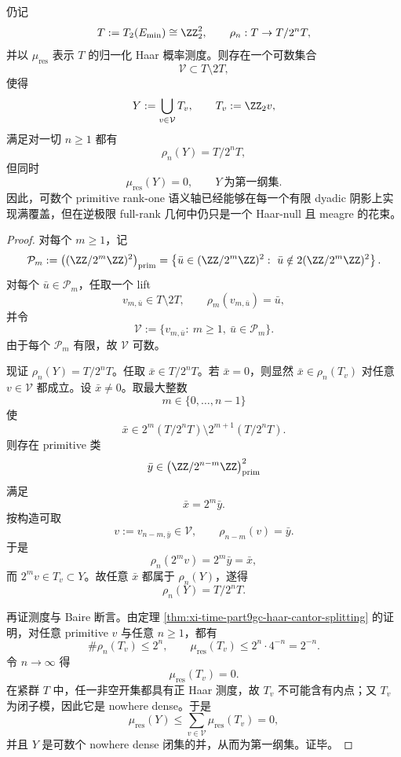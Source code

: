 \begin{theorem}\label{thm:conclusion-tate-rankone-finite-shadow-full-inverse-limit-hollow}
仍记
\[
T:=T_2(E_{\min})\cong \ZZ_2^2,
\qquad
\rho_n:T\to T/2^nT,
\]
并以 \(\mu_{\mathrm{res}}\) 表示 \(T\) 的归一化 Haar 概率测度。则存在一个可数集合
\[
\mathcal V\subset T\setminus 2T,
\]
使得
\[
Y:=\bigcup_{v\in\mathcal V}T_v,
\qquad
T_v:=\ZZ_2v,
\]
满足对一切 \(n\ge 1\) 都有
\[
\rho_n(Y)=T/2^nT,
\]
但同时
\[
\mu_{\mathrm{res}}(Y)=0,
\qquad
Y\ \text{为第一纲集}.
\]
因此，可数个 primitive rank-one 语义轴已经能够在每一个有限 dyadic 阴影上实现满覆盖，但在逆极限 full-rank 几何中仍只是一个 Haar-null 且 meagre 的花束。
\end{theorem}
\begin{proof}
对每个 \(m\ge 1\)，记
\[
\mathcal P_m:=
\left((\ZZ/2^m\ZZ)^2\right)_{\mathrm{prim}}
=
\left\{
\bar u\in (\ZZ/2^m\ZZ)^2:\ \bar u\notin 2(\ZZ/2^m\ZZ)^2
\right\}.
\]
对每个 \(\bar u\in \mathcal P_m\)，任取一个 lift
\[
v_{m,\bar u}\in T\setminus 2T,
\qquad
\rho_m(v_{m,\bar u})=\bar u,
\]
并令
\[
\mathcal V:=\{v_{m,\bar u}:\ m\ge 1,\ \bar u\in \mathcal P_m\}.
\]
由于每个 \(\mathcal P_m\) 有限，故 \(\mathcal V\) 可数。

现证 \(\rho_n(Y)=T/2^nT\)。任取 \(\bar x\in T/2^nT\)。若 \(\bar x=0\)，则显然 \(\bar x\in \rho_n(T_v)\) 对任意 \(v\in \mathcal V\) 都成立。设 \(\bar x\neq 0\)。取最大整数
\[
m\in \{0,\dots,n-1\}
\]
使
\[
\bar x\in 2^m(T/2^nT)\setminus 2^{m+1}(T/2^nT).
\]
则存在 primitive 类
\[
\bar y\in \left(\ZZ/2^{n-m}\ZZ\right)^2_{\mathrm{prim}}
\]
满足
\[
\bar x=2^m\bar y.
\]
按构造可取
\[
v:=v_{n-m,\bar y}\in \mathcal V,
\qquad
\rho_{n-m}(v)=\bar y.
\]
于是
\[
\rho_n(2^mv)=2^m\bar y=\bar x,
\]
而 \(2^mv\in T_v\subset Y\)。故任意 \(\bar x\) 都属于 \(\rho_n(Y)\)，遂得
\[
\rho_n(Y)=T/2^nT.
\]

再证测度与 Baire 断言。由定理 \ref{thm:xi-time-part9gc-haar-cantor-splitting} 的证明，对任意 primitive \(v\) 与任意 \(n\ge 1\)，都有
\[
\#\rho_n(T_v)\le 2^n,
\qquad
\mu_{\mathrm{res}}(T_v)\le 2^n\cdot 4^{-n}=2^{-n}.
\]
令 \(n\to\infty\) 得
\[
\mu_{\mathrm{res}}(T_v)=0.
\]
在紧群 \(T\) 中，任一非空开集都具有正 Haar 测度，故 \(T_v\) 不可能含有内点；又 \(T_v\) 为闭子模，因此它是 nowhere dense。于是
\[
\mu_{\mathrm{res}}(Y)
\le
\sum_{v\in \mathcal V}\mu_{\mathrm{res}}(T_v)
=0,
\]
并且 \(Y\) 是可数个 nowhere dense 闭集的并，从而为第一纲集。证毕。
\end{proof}

